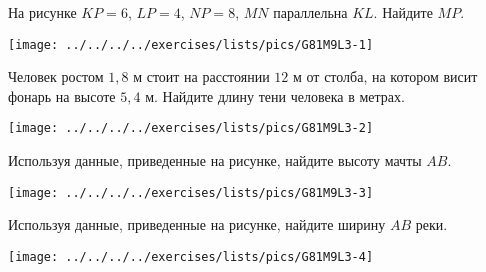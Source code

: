 \begin{class}[number=3]
	\begin{listofex} 
		\item 
		\begin{minipage}[t]{\bodywidth}
			На рисунке \( KP = 6 \), \( LP = 4 \), \( NP = 8 \), \( MN \)
		параллельна \(  KL \). Найдите \( MP \). 
		\end{minipage}
		\hspace{0.02\linewidth}
		\begin{minipage}[t]{\picwidth}
			\texttt{[image: ../../../../exercises/lists/pics/G81M9L3-1]}
		\end{minipage}
		\item 
		\begin{minipage}[t]{\bodywidth}
			 Человек ростом \( 1,8 \) м стоит на расстоянии \( 12 \) м от столба, на котором висит фонарь на высоте \(  5,4 \)
		м. Найдите длину тени человека в метрах.
		\end{minipage}
		\hspace{0.02\linewidth}
		\begin{minipage}[t]{\picwidth}
			\texttt{[image: ../../../../exercises/lists/pics/G81M9L3-2]}
		\end{minipage}
		\item 
		\begin{minipage}[t]{\bodywidth}
			Используя данные, приведенные на рисунке,
			найдите высоту мачты \( AB \). 
		\end{minipage}
		\hspace{0.02\linewidth}
		\begin{minipage}[t]{\picwidth}
			\texttt{[image: ../../../../exercises/lists/pics/G81M9L3-3]}
		\end{minipage}
		\item 
		\begin{minipage}[t]{\bodywidth}
			Используя данные, приведенные на рисунке,
			найдите ширину \( AB \) реки.
		\end{minipage}
		\hspace{0.02\linewidth}
		\begin{minipage}[t]{\picwidth}
			\texttt{[image: ../../../../exercises/lists/pics/G81M9L3-4]}
		\end{minipage}

\end{listofex}
\end{class}
